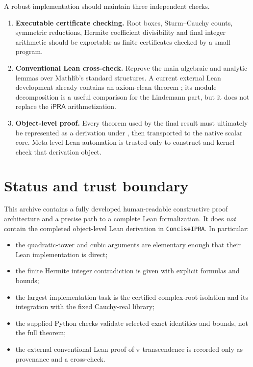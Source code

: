 \documentclass[11pt]{article}
\newcommand{\ipra}{\mathsf{iPRA}}
\newcommand{\code}[1]{\texttt{\detokenize{#1}}}
\begin{document}
A robust implementation should maintain three independent checks.

\begin{enumerate}
\item \textbf{Executable certificate checking.}  Root boxes, Sturm--Cauchy counts, symmetric reductions, Hermite coefficient divisibility and final integer arithmetic should be exportable as finite certificates checked by a small program.
\item \textbf{Conventional Lean cross-check.}  Reprove the main algebraic and analytic lemmas over Mathlib's standard structures.  A current external Lean development already contains an axiom-clean theorem \code{Transcendental Q Real.pi}; its module decomposition is a useful comparison for the Lindemann part, but it does not replace the $\ipra$ arithmetization.
\item \textbf{Object-level proof.}  Every theorem used by the final result must ultimately be represented as a derivation under \code{PRAAx}, then transported to the native scalar core.  Meta-level Lean automation is trusted only to construct and kernel-check that derivation object.
\end{enumerate}

\section{Status and trust boundary}

This archive contains a fully developed human-readable constructive proof architecture and a precise path to a complete Lean formalization.  It does \emph{not} contain the completed object-level Lean derivation in \texttt{ConciseIPRA}.  In particular:

\begin{itemize}
\item the quadratic-tower and cubic arguments are elementary enough that their Lean implementation is direct;
\item the finite Hermite integer contradiction is given with explicit formulas and bounds;
\item the largest implementation task is the certified complex-root isolation and its integration with the fixed Cauchy-real library;
\item the supplied Python checks validate selected exact identities and bounds, not the full theorem;
\item the external conventional Lean proof of $\pi$ transcendence is recorded only as provenance and a cross-check.
\end{itemize}
\end{document}
